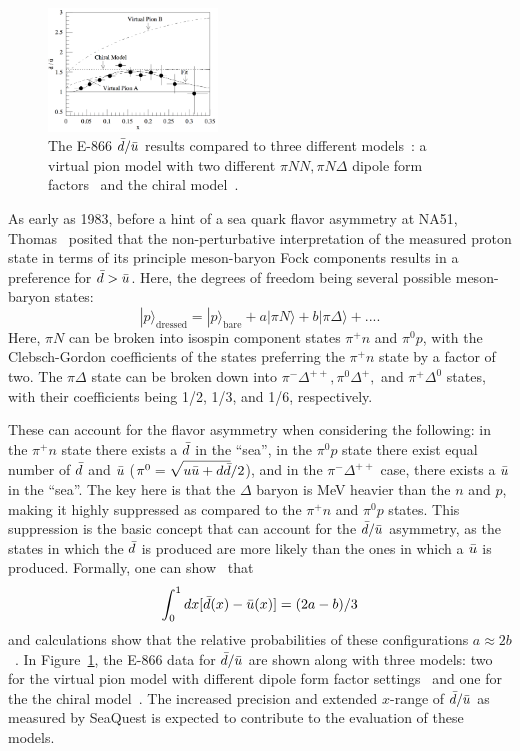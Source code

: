 \begin{figure}
	\centering
	\includegraphics[width=0.4\textwidth]{figures/background/meson-cloud-dbar-ubar.png}
	\caption{The E-866 $\bar{d}/\bar{u}$ results compared to three different models~\cite{Peng:1998pa}: a virtual pion model with two different $\pi NN , \pi N\Delta$ dipole form factors~\cite{Kumano:1990mm, Koepf:1995yh} and the chiral model~\cite{Szczurek:1996tp}.}
	\label{fig:pion-model-dbar-ubar}
\end{figure}
As early as 1983, before a hint of a sea quark flavor asymmetry at NA51, Thomas~\cite{Thomas:1983fh} posited that the non-perturbative interpretation of the measured proton state in terms of its principle meson-baryon Fock components results in a preference for $\bar{d}>\bar{u}$. Here, the degrees of freedom being several possible meson-baryon states:
\begin{equation}
|p\rangle_{\text{dressed}} = |p\rangle_{\text{bare}} + a|\pi N\rangle + b|\pi \Delta\rangle + ... .
\end{equation} 
Here, $\pi N$ can be broken into isospin component states $\pi^+ n$ and $\pi^0 p$, with the Clebsch-Gordon coefficients of the states preferring the $\pi^+ n$ state by a factor of two. The $\pi \Delta$ state can be broken down into $\pi^- \Delta^{++}, \pi^0 \Delta^+,$ and $\pi^+ \Delta^0$ states, with their coefficients being 1/2, 1/3, and 1/6, respectively.

These can account for the flavor asymmetry when considering the following: in the $\pi^+ n$ state there exists a $\bar{d}$ in the ``sea'', in the $\pi^0 p$ state there exist equal number of $\bar{d}$ and $\bar{u}$ ($\pi^0=\sqrt{u\bar{u}+d\bar{d}}/2$), and in the $\pi^- \Delta^{++}$ case, there exists a $\bar{u}$ in the ``sea''. The key here is that the $\Delta$ baryon is \unit[294]{MeV} heavier than the $n$ and $p$, making it highly suppressed as compared to the $\pi^+ n$ and $\pi^0 p$ states. This suppression is the basic concept that can account for the $\bar{d}/\bar{u}$ asymmetry, as the states in which the $\bar{d}$ is produced are more likely than the ones in which a $\bar{u}$ is produced. Formally, one can show~\cite{Szczurek:1993sc} that
\begin{equation}
\int_0^1 dx [\bar{d}(x)-\bar{u}(x)] = (2a-b)/3
\end{equation}
and calculations show that the relative probabilities of these configurations $a \approx 2b$~\cite{Koepf:1995yh}. In Figure~\ref{fig:pion-model-dbar-ubar}, the E-866 data for $\bar{d}/\bar{u}$ are shown along with three models: two for the virtual pion model with different dipole form factor settings~\cite{Kumano:1990mm, Koepf:1995yh} and one for the the chiral model~\cite{Szczurek:1996tp}. The increased precision and extended $x$-range of $\bar{d}/\bar{u}$ as measured by SeaQuest is expected to contribute to the evaluation of these models.

